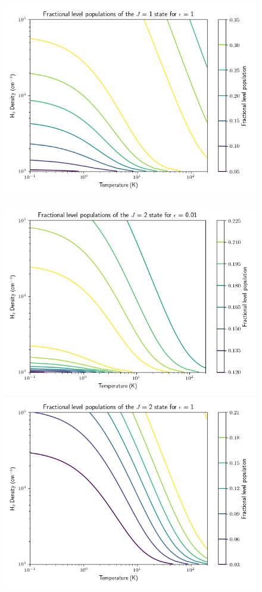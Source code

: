 \documentclass[11pt]{article}
\newenvironment{tight_enumerate}{
\begin{enumerate}[label=(\alph*)]
\setlength{\itemsep}{3pt}
\setlength{\parskip}{0pt}
}{\end{enumerate}}
\begin{document}
\begin{tight_enumerate}
\begin{figure}[H]
\includegraphics[height=0.25\textheight]{1/1_1.png}
\end{figure}
\begin{figure}[H]
\centering
\includegraphics[height=0.25\textheight]{1/2_0.png}
\includegraphics[height=0.25\textheight]{1/2_1.png}

\end{figure}
\end{tight_enumerate}
\end{document}
